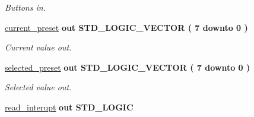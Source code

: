 \begin{DoxyCompactItemize}
\begin{DoxyCompactList}\small\item\em Buttons in. \end{DoxyCompactList}\item 
\hypertarget{classbutton__control_aa730ff47d713456d7cf31891ba98fbfd}{\hyperlink{classbutton__control_aa730ff47d713456d7cf31891ba98fbfd}{current\-\_\-preset}  {\bfseries {\bfseries \textcolor{vhdlkeyword}{out}\textcolor{vhdlchar}{ }}} {\bfseries \textcolor{comment}{S\-T\-D\-\_\-\-L\-O\-G\-I\-C\-\_\-\-V\-E\-C\-T\-O\-R}\textcolor{vhdlchar}{ }\textcolor{vhdlchar}{(}\textcolor{vhdlchar}{ }\textcolor{vhdlchar}{ } \textcolor{vhdldigit}{7} \textcolor{vhdlchar}{ }\textcolor{vhdlchar}{ }\textcolor{vhdlchar}{ }\textcolor{vhdlkeyword}{downto}\textcolor{vhdlchar}{ }\textcolor{vhdlchar}{ }\textcolor{vhdlchar}{ } \textcolor{vhdldigit}{0} \textcolor{vhdlchar}{ }\textcolor{vhdlchar}{)}\textcolor{vhdlchar}{ }} }\label{classbutton__control_aa730ff47d713456d7cf31891ba98fbfd}

\begin{DoxyCompactList}\small\item\em Current value out. \end{DoxyCompactList}\item 
\hypertarget{classbutton__control_acae3f7008d8aaf35bca56c9b3e56df11}{\hyperlink{classbutton__control_acae3f7008d8aaf35bca56c9b3e56df11}{selected\-\_\-preset}  {\bfseries {\bfseries \textcolor{vhdlkeyword}{out}\textcolor{vhdlchar}{ }}} {\bfseries \textcolor{comment}{S\-T\-D\-\_\-\-L\-O\-G\-I\-C\-\_\-\-V\-E\-C\-T\-O\-R}\textcolor{vhdlchar}{ }\textcolor{vhdlchar}{(}\textcolor{vhdlchar}{ }\textcolor{vhdlchar}{ } \textcolor{vhdldigit}{7} \textcolor{vhdlchar}{ }\textcolor{vhdlchar}{ }\textcolor{vhdlchar}{ }\textcolor{vhdlkeyword}{downto}\textcolor{vhdlchar}{ }\textcolor{vhdlchar}{ }\textcolor{vhdlchar}{ } \textcolor{vhdldigit}{0} \textcolor{vhdlchar}{ }\textcolor{vhdlchar}{)}\textcolor{vhdlchar}{ }} }\label{classbutton__control_acae3f7008d8aaf35bca56c9b3e56df11}

\begin{DoxyCompactList}\small\item\em Selected value out. \end{DoxyCompactList}\item 
\hypertarget{classbutton__control_ab89db7a1fc99970f775fa8768438db8a}{\hyperlink{classbutton__control_ab89db7a1fc99970f775fa8768438db8a}{read\-\_\-interupt}  {\bfseries {\bfseries \textcolor{vhdlkeyword}{out}\textcolor{vhdlchar}{ }}} {\bfseries \textcolor{comment}{S\-T\-D\-\_\-\-L\-O\-G\-I\-C}\textcolor{vhdlchar}{ }} }\label{classbutton__control_ab89db7a1fc99970f775fa8768438db8a}


\end{DoxyCompactItemize}
